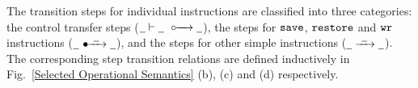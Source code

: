 

%				
%				
%				
%				

The transition steps for individual instructions are classified into
three categories: the control transfer steps 
(${\underline{\ \,}} \vdash {\underline{\ \,}} \; \ \circ\mkern-7mu\xrightarrow{\quad} {\underline{\ \,}}$), 
the steps for
$\texttt{save}$, $\texttt{restore}$ and $\texttt{wr}$ instructions 
($\swtrans{\notCare}{\ \notCare\ }{\notCare}$),
and the steps
for other simple instructions
(${\underline{\ \,}} \xrightarrow{{\ \underline{\ \,}\ }} {\underline{\ \,}}$). The
corresponding step transition relations are defined inductively 
in Fig.~\ref{Selected Operational Semantics} (b), (c) and (d)
respectively.

